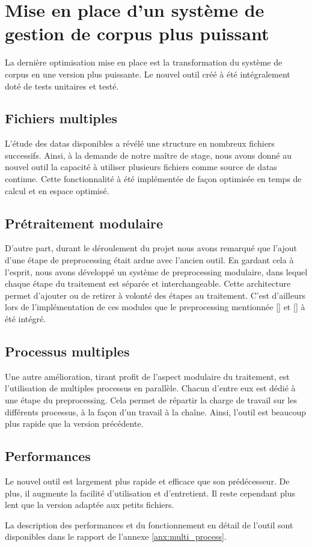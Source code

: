 \section{Mise en place d'un système de gestion de corpus plus puissant}\label{sec:papud_mulitiqueue}
La dernière optimisation mise en place est la transformation du système de corpus en une version plus puissante. Le nouvel outil créé à été intégralement doté de tests unitaires et testé.

\subsection{Fichiers multiples}
L'étude des \glspl{data} disponibles a révélé une structure en nombreux fichiers successifs.
Ainsi, à la demande de notre maître de stage, nous avons donné au nouvel outil la capacité à utiliser plusieurs fichiers comme source de \glspl{data} continue.
Cette fonctionnalité à été implémentée de façon optimisée en temps de calcul et en espace optimisé.

\subsection{Prétraitement modulaire}
D'autre part, durant le déroulement du projet nous avons remarqué que l'ajout d'une étape de \gls{preprocessing} était ardue avec l'ancien outil.
En gardant cela à l'esprit, nous avons développé un système de \gls{preprocessing} modulaire, dans lequel chaque étape du traitement est séparée et interchangeable.
Cette architecture permet d'ajouter ou de retirer à volonté des étapes au traitement.
C'est d'ailleurs lors de l'implémentation de ces modules que le \gls{preprocessing} mentionnée \autoref{} et \autoref{} à été intégré.

\subsection{Processus multiples}
Une autre amélioration, tirant profit de l'aspect modulaire du traitement, est l'utilisation de multiples processus en parallèle.
Chacun d'entre eux est dédié à une étape du \gls{preprocessing}.
Cela permet de répartir la charge de travail sur les différents processus, à la façon d'un travail à la chaîne.
Ainsi, l'outil est beaucoup plus rapide que la version précédente.

\subsection{Performances}
Le nouvel outil est largement plus rapide et efficace que son prédécesseur.
De plus, il augmente la facilité d'utilisation et d'entretient.
Il reste cependant plus lent que la version adaptée aux petits fichiers.

La description des performances et du fonctionnement en détail de l'outil sont disponibles dans le rapport de l'annexe \ref{anx:multi_process}.
